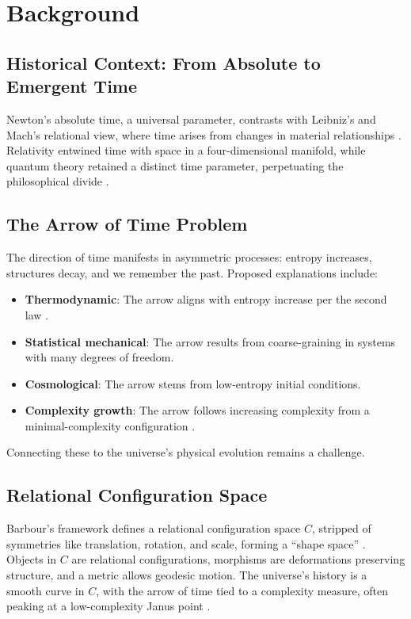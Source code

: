 \documentclass[11pt]{article}
\begin{document}
\section{Background}

\subsection{Historical Context: From Absolute to Emergent Time}
Newton’s absolute time, a universal parameter, contrasts with Leibniz’s and Mach’s relational view, where time arises from changes in material relationships \citep{Newton1687, Leibniz1715}. Relativity entwined time with space in a four-dimensional manifold, while quantum theory retained a distinct time parameter, perpetuating the philosophical divide \citep{Einstein1915}.

\subsection{The Arrow of Time Problem}
The direction of time manifests in asymmetric processes: entropy increases, structures decay, and we remember the past. Proposed explanations include:
\begin{itemize}
    \item \textbf{Thermodynamic}: The arrow aligns with entropy increase per the second law \citep{Penrose1989}.
    \item \textbf{Statistical mechanical}: The arrow results from coarse-graining in systems with many degrees of freedom.
    \item \textbf{Cosmological}: The arrow stems from low-entropy initial conditions.
    \item \textbf{Complexity growth}: The arrow follows increasing complexity from a minimal-complexity configuration \citep{Barbour2014}.
\end{itemize}
Connecting these to the universe’s physical evolution remains a challenge.

\subsection{Relational Configuration Space}
Barbour’s framework defines a relational configuration space $C$, stripped of symmetries like translation, rotation, and scale, forming a “shape space” \citep{Barbour1994}. Objects in $C$ are relational configurations, morphisms are deformations preserving structure, and a metric allows geodesic motion. The universe’s history is a smooth curve in $C$, with the arrow of time tied to a complexity measure, often peaking at a low-complexity Janus point \citep{Barbour2014}.
\end{document}
